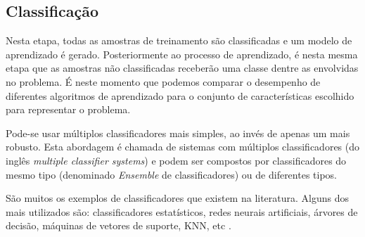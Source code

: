 \subsection{Classificação}\label{sec:classificacao}

Nesta etapa, todas as amostras de treinamento são classificadas e um modelo de aprendizado é gerado. Posteriormente ao processo de aprendizado, é nesta mesma etapa que as amostras não classificadas receberão uma classe dentre as envolvidas no problema. É neste momento que podemos comparar o desempenho de diferentes algoritmos de aprendizado para o conjunto de características escolhido para representar o problema.

Pode-se usar múltiplos classificadores mais simples, ao invés de apenas um mais robusto. Esta abordagem é chamada de sistemas com múltiplos classificadores (do inglês \textit{multiple classifier systems}) e podem ser compostos por classificadores do mesmo tipo (denominado \textit{Ensemble} de classificadores) ou de diferentes tipos.

São muitos os exemplos de classificadores que existem na literatura. Alguns dos mais utilizados são: classificadores estatísticos, redes neurais artificiais, árvores de decisão, máquinas de vetores de suporte, KNN, etc \cite{jain:1989}. 






